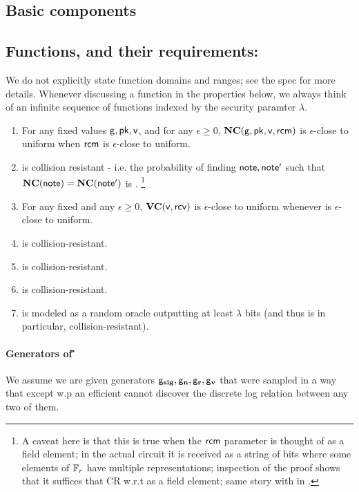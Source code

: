 \documentclass[11pt]{article}
\numberwithin{equation}{section} %
\numberwithin{figure}{section} %
\newcommand{\eps}{\ensuremath{\epsilon}\xspace}
\begin{document}
 \subsection{Basic components}
\subsection*{Functions, and their requirements:}
We do not explicitly state function domains and ranges; see the spec for more details.
Whenever discussing a function in the properties below, we always think of an infinite sequence of functions indexed by the security paramter $\lambda$.
\begin{enumerate}
 \item For any fixed values $\mathsf{g},\mathsf{pk},\mathsf{v}$, and for any $\eps\geq 0$, $\mathbf{NC}(\mathsf{g},\mathsf{pk},\mathsf{v},\mathsf{rcm})$ is $\eps$-close to uniform when $\mathsf{rcm}$ is $\eps$-close to uniform.
 \item \notecom is collision resistant - i.e. the probability of finding $\mathsf{note},\mathsf{note}'$ such that $\mathbf{NC}(\mathsf{note})=\mathbf{NC}(\mathsf{note}')$ is \negl. \footnote{A caveat here is that this is true when the $\mathsf{rcm}$ parameter is thought of as a field element; in the actual circuit it is received as a string of bits where some elements of ${\mathbb F}_r$ have multiple representations; inspection of the proof shows that it suffices that CR w.r.t \rcm as a field element; same story with \rcv in \valcom.}
\item For any fixed \val and any $\eps\geq 0$, $\mathbf{VC}(\mathsf{v},\mathsf{rcv})$ is $\eps$-close to uniform whenever \rcv is $\eps$-close to uniform. 
\item \valcom is collision-resistant.
\item \sighash is collision-resistant.
\item \IVK is collision-resistant.
\item \NF is modeled as a random oracle outputting at least $\lambda$ bits (and thus is in particular, collision-resistant).
\end{enumerate}
\paragraph{Generators of \G}
We assume we are given generators $\mathsf{g}_{\mathbf{sig}},\mathsf{g}_{\mathbf{n}},\mathsf{g}_\mathbf{r},\mathsf{g}_{\mathbf{v}}$ that were sampled in a way that except w.p \negl
an efficient \adv cannot discover the discrete log relation between any two of them.
\end{document}
